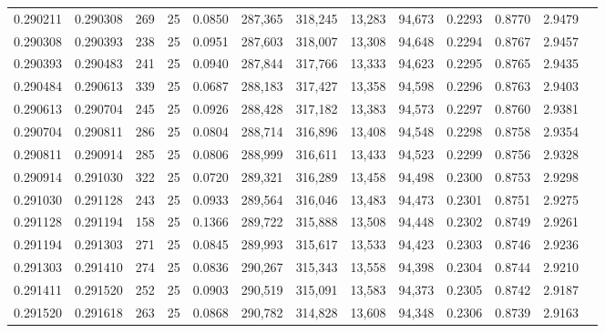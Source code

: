 \begin{tabular}{rrrrrrrrrrrrr}
0.290211 & 0.290308 &   269 &  25 &                                     0.0850 & 287,365 & 318,245 &  13,283 &  94,673 & 0.2293 & 0.8770 & 2.9479 \\
0.290308 & 0.290393 &   238 &  25 &                                     0.0951 & 287,603 & 318,007 &  13,308 &  94,648 & 0.2294 & 0.8767 & 2.9457 \\
0.290393 & 0.290483 &   241 &  25 &                                     0.0940 & 287,844 & 317,766 &  13,333 &  94,623 & 0.2295 & 0.8765 & 2.9435 \\
0.290484 & 0.290613 &   339 &  25 &                                     0.0687 & 288,183 & 317,427 &  13,358 &  94,598 & 0.2296 & 0.8763 & 2.9403 \\
0.290613 & 0.290704 &   245 &  25 &                                     0.0926 & 288,428 & 317,182 &  13,383 &  94,573 & 0.2297 & 0.8760 & 2.9381 \\
0.290704 & 0.290811 &   286 &  25 &                                     0.0804 & 288,714 & 316,896 &  13,408 &  94,548 & 0.2298 & 0.8758 & 2.9354 \\
0.290811 & 0.290914 &   285 &  25 &                                     0.0806 & 288,999 & 316,611 &  13,433 &  94,523 & 0.2299 & 0.8756 & 2.9328 \\
0.290914 & 0.291030 &   322 &  25 &                                     0.0720 & 289,321 & 316,289 &  13,458 &  94,498 & 0.2300 & 0.8753 & 2.9298 \\
0.291030 & 0.291128 &   243 &  25 &                                     0.0933 & 289,564 & 316,046 &  13,483 &  94,473 & 0.2301 & 0.8751 & 2.9275 \\
0.291128 & 0.291194 &   158 &  25 &                                     0.1366 & 289,722 & 315,888 &  13,508 &  94,448 & 0.2302 & 0.8749 & 2.9261 \\
0.291194 & 0.291303 &   271 &  25 &                                     0.0845 & 289,993 & 315,617 &  13,533 &  94,423 & 0.2303 & 0.8746 & 2.9236 \\
0.291303 & 0.291410 &   274 &  25 &                                     0.0836 & 290,267 & 315,343 &  13,558 &  94,398 & 0.2304 & 0.8744 & 2.9210 \\
0.291411 & 0.291520 &   252 &  25 &                                     0.0903 & 290,519 & 315,091 &  13,583 &  94,373 & 0.2305 & 0.8742 & 2.9187 \\
0.291520 & 0.291618 &   263 &  25 &                                     0.0868 & 290,782 & 314,828 &  13,608 &  94,348 & 0.2306 & 0.8739 & 2.9163 \\

\end{tabular}
